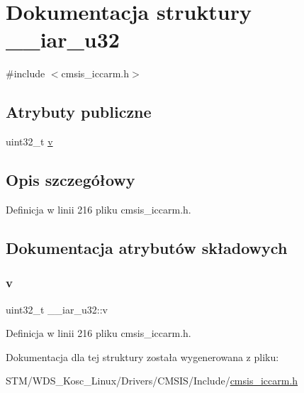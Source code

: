 \hypertarget{struct____iar__u32}{}\section{Dokumentacja struktury \+\_\+\+\_\+iar\+\_\+u32}
\label{struct____iar__u32}


{\ttfamily \#include $<$cmsis\+\_\+iccarm.\+h$>$}

\subsection*{Atrybuty publiczne}
\begin{DoxyCompactItemize}
\item 
uint32\+\_\+t \hyperlink{struct____iar__u32_af8b16b2c629a3f2264c1af078ef2578a}{v}
\end{DoxyCompactItemize}


\subsection{Opis szczegółowy}


Definicja w linii 216 pliku cmsis\+\_\+iccarm.\+h.



\subsection{Dokumentacja atrybutów składowych}
\mbox{\label{struct____iar__u32_af8b16b2c629a3f2264c1af078ef2578a}} 
\subsubsection{\texorpdfstring{v}{v}}
{\footnotesize\ttfamily uint32\+\_\+t \+\_\+\+\_\+iar\+\_\+u32\+::v}



Definicja w linii 216 pliku cmsis\+\_\+iccarm.\+h.



Dokumentacja dla tej struktury została wygenerowana z pliku\+:\begin{DoxyCompactItemize}
\item 
S\+T\+M/\+W\+D\+S\+\_\+\+Kosc\+\_\+\+Linux/\+Drivers/\+C\+M\+S\+I\+S/\+Include/\hyperlink{cmsis__iccarm_8h}{cmsis\+\_\+iccarm.\+h}\end{DoxyCompactItemize}

